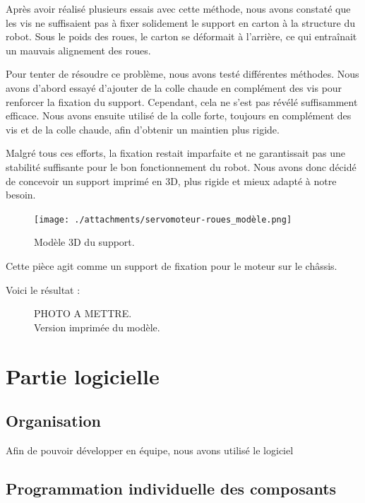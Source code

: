 \documentclass[a4paper,12pt]{report}  %
\begin{document}
Après avoir réalisé plusieurs essais avec cette méthode, nous avons constaté que les vis ne suffisaient pas à fixer solidement le support en carton à la structure du robot. Sous le poids des roues, le carton se déformait à l’arrière, ce qui entraînait un mauvais alignement des roues.

Pour tenter de résoudre ce problème, nous avons testé différentes méthodes. Nous avons d’abord essayé d’ajouter de la colle chaude en complément des vis pour renforcer la fixation du support. Cependant, cela ne s’est pas révélé suffisamment efficace. Nous avons ensuite utilisé de la colle forte, toujours en complément des vis et de la colle chaude, afin d’obtenir un maintien plus rigide.

Malgré tous ces efforts, la fixation restait imparfaite et ne garantissait pas une stabilité suffisante pour le bon fonctionnement du robot. Nous avons donc décidé de concevoir un support imprimé en 3D, plus rigide et mieux adapté à notre besoin.

\begin{figure}[H]
	\centering
	\texttt{[image: ./attachments/servomoteur-roues\_modèle.png]}
	\caption{Modèle 3D du support.}
\end{figure}

Cette pièce agit comme un support de fixation pour le moteur sur le châssis.

Voici le résultat : 

\begin{figure}[H]
	\centering
	\caption{PHOTO A METTRE. \\ Version imprimée du modèle.}
\end{figure}

\section{Partie logicielle}
\subsection{Organisation}

Afin de pouvoir développer en équipe, nous avons utilisé le logiciel \texttt{}

\subsection{Programmation individuelle des composants}
\end{document}
